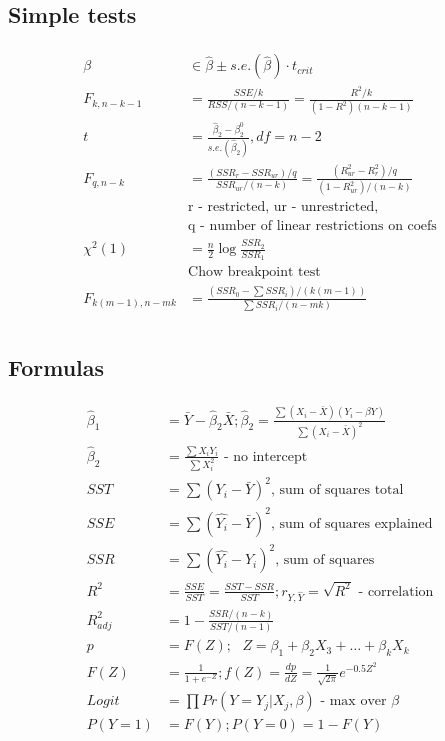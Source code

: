 \documentclass{article}
\def\Eq#1{{\begin{gather}\begin{split} #1 \end{split}\end{gather}}}
\begin{document}
\begin{multicols}{2}

\subsection*{Simple tests}

\Eq{
    \beta &\in \hat{\beta} \pm s.e.(\hat{\beta}) \cdot t_{crit} \\
    F_{k, n - k - 1} &= \frac{SSE/k}{RSS / (n - k - 1)} = \frac{R^2 / k}{(1 - R^2)(n - k - 1)} \\
    t &= \frac{\hat{\beta}_2 - \beta^0_2}{s.e.(\hat{\beta}_2)}, df = n-2 \\
    F_{q,n-k} &= \frac{(SSR_r - SSR_{ur}) / q}{SSR_{ur} / (n-k)} = \frac{(R^2_{ur} - R_r^2) / q}{(1 - R^2_{ur})/(n - k)} \\
    &\text{r - restricted, ur - unrestricted, } \\
    &\text{q - number of linear restrictions on coefs} \\
    \chi^2(1) &= \frac{n}{2}\log\frac{SSR_2}{SSR_1} \\
    &\text{Chow breakpoint test} \\
    F_{k(m-1),n-m k} &= \frac{(SSR_0 - \sum SSR_i) / (k(m - 1))}{\sum SSR_i / (n - m k)} \\
}

\subsection*{Formulas}

\Eq{
    \hat{\beta}_1 &= \bar{Y} - \hat{\beta}_2 \bar{X}; \hat{\beta}_2 = \frac{\sum (X_i - \bar{X})(Y_i - \beta{Y})}{\sum (X_i - \bar{X})^2} \\
    \hat{\beta}_2 &= \frac{\sum X_i Y_i}{\sum X_i^2} \text{ - no intercept} \\
    SST &= \sum (Y_i - \bar{Y})^2 \text{, sum of squares total} \\
    SSE &= \sum (\hat{Y_i} - \bar{Y})^2 \text{, sum of squares explained} \\
    SSR &= \sum (\hat{Y_i} - Y_i)^2 \text{, sum of squares } \\
    R^2 &= \frac{SSE}{SST} = \frac{SST - SSR}{SST}; r_{Y,\hat{Y}} = \sqrt{R^2} \text{ - correlation} \\
    R^2_{adj} &= 1 - \frac{SSR/(n - k)}{SST / (n - 1)} \\
    p &= F(Z);\text{  } Z = \beta_1 + \beta_2 X_3 + \dots + \beta_k X_k \\
    F(Z) &= \frac{1}{1 + e^{-Z}}; f(Z) = \frac{dp}{dZ} = \frac{1}{\sqrt{2 \pi}}e^{-0.5Z^2} \\
    Logit &= \prod Pr(Y = Y_j | X_j, \beta) \text{ - max over $\beta$} \\
    P(Y = 1) &= F(Y); P(Y = 0) = 1 - F(Y)
}

\end{multicols}
\end{document}
